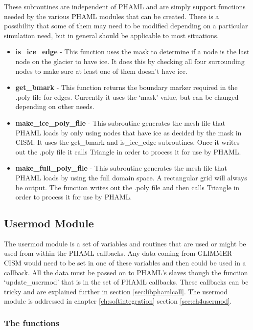 These subroutines are independent of PHAML and are simply support functions needed by the various PHAML modules that can be created.  There is a possibility that some of them may need to be modified depending on a particular simulation need, but in general should be applicable to most situations.

\begin{itemize}
\item \textbf{is\_ice\_edge} - This function uses the mask to determine if a node is the last node on the glacier to have ice.  It does this by checking all four surrounding nodes to make sure at least one of them doesn't have ice. 
\item \textbf{get\_bmark} - This function returns the boundary marker required in the .poly file for edges.  Currently it uses the `mask' value, but can be changed depending on other needs.
\item \textbf{make\_ice\_poly\_file} - This subroutine generates the mesh file that PHAML loads by only using nodes that have ice as decided by the mask in CISM.  It uses the get\_bmark and is\_ice\_edge subroutines.  Once it writes out the .poly file it calls Triangle in order to process it for use by PHAML.  
\item \textbf{make\_full\_poly\_file} - This subroutine generates the mesh file that PHAML loads by using the full domain space.  A rectangular grid will always be output.  The function writes out the .poly file and then calls Triangle in order to process it for use by PHAML.  
\end{itemize}

\subsection{Usermod Module}\label{sec:libfuncuser}

The usermod module is a set of variables and routines that are used or might be used from within the PHAML callbacks.  Any data coming from GLIMMER-CISM would need to be set in one of these variables and then could be used in a callback.  All the data must be passed on to PHAML's slaves though the function `update\_usermod' that is in the set of PHAML callbacks.  These callbacks can be tricky and are explained further in section \ref{sec:libphamlcall}.  The usermod module is addressed in chapter \ref{ch:softintegration} section \ref{sec:ch4usermod}.

\subsubsection{The functions}

